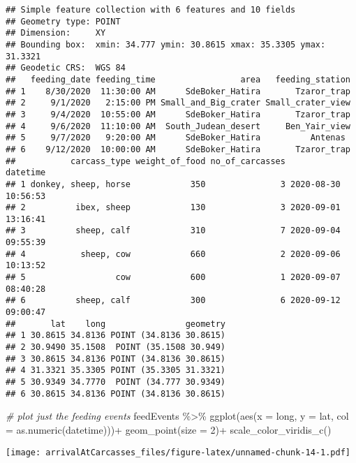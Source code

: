 \documentclass[
]{article}
\newenvironment{Shaded}{\begin{snugshade}}{\end{snugshade}}
\newcommand{\AttributeTok}[1]{\textcolor[rgb]{0.77,0.63,0.00}{#1}}
\newcommand{\CommentTok}[1]{\textcolor[rgb]{0.56,0.35,0.01}{\textit{#1}}}
\newcommand{\DecValTok}[1]{\textcolor[rgb]{0.00,0.00,0.81}{#1}}
\newcommand{\FunctionTok}[1]{\textcolor[rgb]{0.00,0.00,0.00}{#1}}
\newcommand{\NormalTok}[1]{#1}
\newcommand{\SpecialCharTok}[1]{\textcolor[rgb]{0.00,0.00,0.00}{#1}}
\begin{document}
\begin{verbatim}
## Simple feature collection with 6 features and 10 fields
## Geometry type: POINT
## Dimension:     XY
## Bounding box:  xmin: 34.777 ymin: 30.8615 xmax: 35.3305 ymax: 31.3321
## Geodetic CRS:  WGS 84
##   feeding_date feeding_time                 area   feeding_station
## 1    8/30/2020  11:30:00 AM      SdeBoker_Hatira       Tzaror_trap
## 2     9/1/2020   2:15:00 PM Small_and_Big_crater Small_crater_view
## 3     9/4/2020  10:55:00 AM      SdeBoker_Hatira       Tzaror_trap
## 4     9/6/2020  11:10:00 AM  South_Judean_desert     Ben_Yair_view
## 5     9/7/2020   9:20:00 AM      SdeBoker_Hatira          Antenas 
## 6    9/12/2020  10:00:00 AM      SdeBoker_Hatira       Tzaror_trap
##           carcass_type weight_of_food no_of_carcasses            datetime
## 1 donkey, sheep, horse            350               3 2020-08-30 10:56:53
## 2          ibex, sheep            130               3 2020-09-01 13:16:41
## 3          sheep, calf            310               7 2020-09-04 09:55:39
## 4           sheep, cow            660               2 2020-09-06 10:13:52
## 5                  cow            600               1 2020-09-07 08:40:28
## 6          sheep, calf            300               6 2020-09-12 09:00:47
##       lat    long                geometry
## 1 30.8615 34.8136 POINT (34.8136 30.8615)
## 2 30.9490 35.1508  POINT (35.1508 30.949)
## 3 30.8615 34.8136 POINT (34.8136 30.8615)
## 4 31.3321 35.3305 POINT (35.3305 31.3321)
## 5 30.9349 34.7770  POINT (34.777 30.9349)
## 6 30.8615 34.8136 POINT (34.8136 30.8615)
\end{verbatim}

\begin{Shaded}
\begin{Highlighting}[]
\CommentTok{\# plot just the feeding events}
\NormalTok{feedEvents }\SpecialCharTok{\%\textgreater{}\%}
  \FunctionTok{ggplot}\NormalTok{(}\FunctionTok{aes}\NormalTok{(}\AttributeTok{x =}\NormalTok{ long, }\AttributeTok{y =}\NormalTok{ lat, }\AttributeTok{col =} \FunctionTok{as.numeric}\NormalTok{(datetime)))}\SpecialCharTok{+}
  \FunctionTok{geom\_point}\NormalTok{(}\AttributeTok{size =} \DecValTok{2}\NormalTok{)}\SpecialCharTok{+}
  \FunctionTok{scale\_color\_viridis\_c}\NormalTok{()}
\end{Highlighting}
\end{Shaded}

\texttt{[image: arrivalAtCarcasses\_files/figure-latex/unnamed-chunk-14-1.pdf]}
\end{document}
